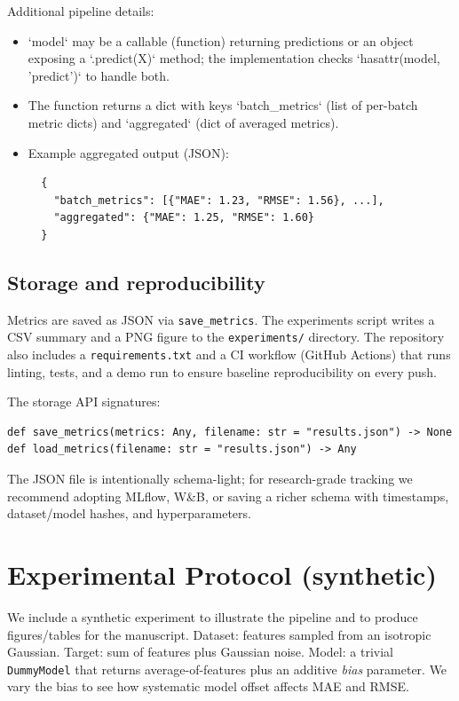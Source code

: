 \documentclass[11pt]{article}
\begin{document}
Additional pipeline details:
\begin{itemize}
  \item `model` may be a callable (function) returning predictions or an object exposing a `.predict(X)` method; the implementation checks `hasattr(model, 'predict')` to handle both.
  \item The function returns a dict with keys `batch_metrics` (list of per-batch metric dicts) and `aggregated` (dict of averaged metrics).
  \item Example aggregated output (JSON):
  \begin{verbatim}
  {
    "batch_metrics": [{"MAE": 1.23, "RMSE": 1.56}, ...],
    "aggregated": {"MAE": 1.25, "RMSE": 1.60}
  }
  \end{verbatim}
\end{itemize}

\subsection{Storage and reproducibility}
Metrics are saved as JSON via \texttt{save\_metrics}. The experiments script writes a CSV summary and a PNG figure to the \texttt{experiments/} directory. The repository also includes a \texttt{requirements.txt} and a CI workflow (GitHub Actions) that runs linting, tests, and a demo run to ensure baseline reproducibility on every push.

The storage API signatures:
\begin{verbatim}
def save_metrics(metrics: Any, filename: str = "results.json") -> None
def load_metrics(filename: str = "results.json") -> Any
\end{verbatim}

The JSON file is intentionally schema-light; for research-grade tracking we recommend adopting MLflow, W&B, or saving a richer schema with timestamps, dataset/model hashes, and hyperparameters.

\section{Experimental Protocol (synthetic)}
We include a synthetic experiment to illustrate the pipeline and to produce figures/tables for the manuscript. Dataset: features sampled from an isotropic Gaussian. Target: sum of features plus Gaussian noise. Model: a trivial \texttt{DummyModel} that returns average-of-features plus an additive \emph{bias} parameter. We vary the bias to see how systematic model offset affects MAE and RMSE.
\end{document}
